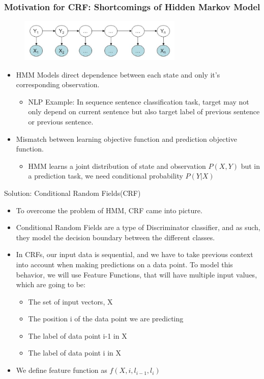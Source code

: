 \documentclass[10pt]{beamer}
\theoremstyle{remark}
\theoremstyle{definition}
\begin{document}
\begin{frame}
\frametitle{Motivation for CRF: Shortcomings of Hidden Markov Model}
\begin{figure}
		\centering
			\includegraphics[height=0.8in]{style_files_stanford/hmm1.png}
	\end{figure}
	\begin{itemize}
	    \item HMM Models direct dependence between each state and only it's corresponding observation.
		\begin{itemize}
    		\item NLP Example: In sequence sentence classification task, target may not only depend on current sentence but also target label of previous sentence or previous sentence.
		\end{itemize}
		\item Mismatch between learning objective function and prediction objective function.
		\begin{itemize}
    		\item HMM learns a joint distribution of state and observation \(P(X,Y)\) but in a prediction task, we need conditional probability \(P(Y|X)\)
		\end{itemize}
	\end{itemize}
\end{frame}

\begin{frame}{Solution: Conditional Random Fields(CRF)}
\begin{itemize}
    \item To overcome the problem of HMM, CRF came into picture.
    \item  Conditional Random Fields are a type of Discriminator classifier, and as such, they model the decision boundary between the different classes.
    \item In CRFs, our input data is sequential, and we have to take previous context into account when making predictions on a data point. To model this behavior, we will use Feature Functions, that will have multiple input values, which are going to be:
    \begin{itemize}
    		\item The set of input vectors, X
            \item The position i of the data point we are predicting
            \item The label of data point i-1 in X
            \item The label of data point i in X
		\end{itemize}
	\item We define feature function as \(f(X,i,l_{i-1},l_i)\)
\end{itemize}
\end{frame}
\end{document}
